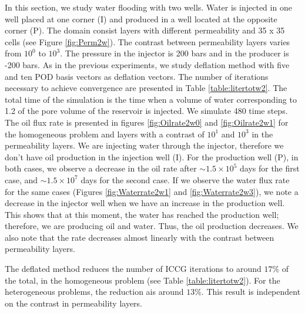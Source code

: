 \documentclass[12pt]{article}
\begin{document}
{\hspace{0.5cm}In this section, we study water flooding with two wells. Water is injected in one well placed at one corner (I) and produced in a well located at the opposite corner (P). The domain consist layers with different permeability and 35 x 35 cells (see Figure \ref{fig:Perm2w}). The contrast between permeability layers varies from $10^0$ to $10^3$. The pressure in the injector is 200 bars and in the producer is -200 bars. As in the previous experiments, we study deflation method with five and ten POD basis vectors as deflation vectors. The number of iterations necessary to achieve convergence are presented in Table \ref{table:litertotw2}. The total time of the simulation is the time when a volume of water corresponding to 1.2 of the pore volume of the reservoir%
 is injected. %
 We simulate 480 time steps. The oil flux rate is presented in figures \ref{fig:Oilrate2w0} \label{fig:Oilrate2w1} and \ref{fig:Oilrate2w1} for the homogeneous problem and layers with a contrast of $10^1$ and $10^3$ in the permeability layers. We are injecting water through the injector, therefore we don't have oil production in the injection well (I). For the production well (P), in both cases, we observe a decrease in the oil rate after $\sim 1.5 \times 10^5$ days for the first case, and $\sim 1.5 \times 10^7$ days for the second case. If we observe the water flux rate for the same cases (Figures \ref{fig:Waterrate2w1} and \ref{fig:Waterrate2w3}), we note a decrease in the injector well when we have an increase in the production well. This shows that at this moment, the water has reached the production well; therefore, we are producing oil and water. Thus, the oil production decreases. We also note that the rate decreases almost linearly with the contrast between permeability layers. 
\par
The deflated method reduces the number of ICCG iterations to around $ 17\%$ of the total, in the homogeneous problem (see Table \ref{table:litertotw2}). For the heterogeneous problems, the reduction ais around $13\%$. This result is independent on the contrast in permeability layers. \par




}
\end{document}
